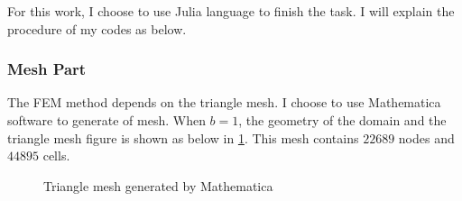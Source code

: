 For this work, I choose to use Julia language to finish the task. 
I will explain the procedure of my codes as below.

\subsubsection{Mesh Part}

The FEM method depends on the triangle mesh. 
I choose to use Mathematica software to generate of mesh.
When $b=1$, the geometry of the domain and the triangle mesh figure is shown 
as below in \ref{Triangle mesh generated by Mathematica}. 
This mesh contains $22689$ nodes and $44895$ cells.

\begin{figure}[H]
    \centering
    \quad
    \caption{Triangle mesh generated by Mathematica}
    \label{Triangle mesh generated by Mathematica}
\end{figure}

